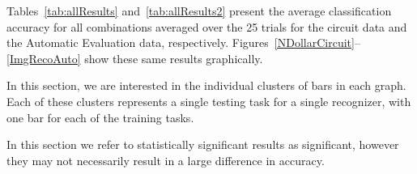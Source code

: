 \documentclass[final,5p,twocolumn]{elsarticle}
\providecommand{\note}[1]{\textcolor{red}{\textbf{ #1 }}}
\begin{document}


Tables~\ref{tab:allResults} and~\ref{tab:allResults2} present
 the average classification
accuracy for all combinations averaged over the 25 trials for the circuit
data and the Automatic Evaluation data, respectively.  
Figures~\ref{NDollarCircuit}--\ref{ImgRecoAuto} show these same results graphically.

In this section, we are interested in the individual clusters of bars in each 
graph.  Each of these clusters represents a single testing task for a single recognizer, 
with one bar for each of the training tasks.  

In this section we refer to statistically significant results as significant, however they 
may not necessarily result in a large difference in accuracy.
\end{document}
